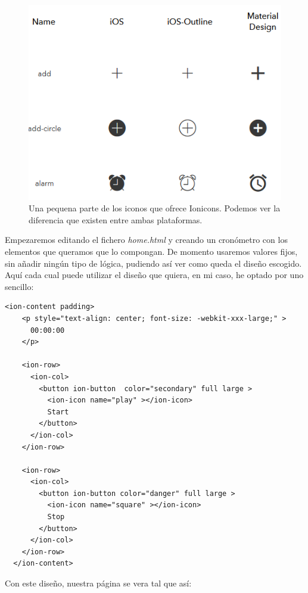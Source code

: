 \begin{figure}[H]
\centering
  \includegraphics{Figures/ch2/Chronometer/ionicons}
  \caption{Una pequena parte de los iconos que ofrece Ionicons. Podemos ver la diferencia que existen entre ambas plataformas.}
\end{figure}

Empezaremos editando el fichero \emph{home.html} y creando un cronómetro con los elementos que queramos que lo compongan. De momento usaremos valores fijos, sin añadir ningún tipo de lógica, pudiendo así ver como queda el diseño escogido. Aquí cada cual puede utilizar el diseño que quiera, en mi caso, he optado por uno sencillo:

\begin{lstlisting}[style=htmlcssjs,frame=tlrb,xleftmargin={0.2cm}]
  <ion-content padding>
    <p style="text-align: center; font-size: -webkit-xxx-large;" >
      00:00:00
    </p>

    <ion-row>
      <ion-col>
        <button ion-button  color="secondary" full large >
          <ion-icon name="play" ></ion-icon>
          Start
        </button>
      </ion-col>
    </ion-row>

    <ion-row>
      <ion-col>
        <button ion-button color="danger" full large >
          <ion-icon name="square" ></ion-icon>
          Stop
        </button>
      </ion-col>
    </ion-row>
  </ion-content>
\end{lstlisting}

Con este diseño, nuestra página se vera tal que así:

